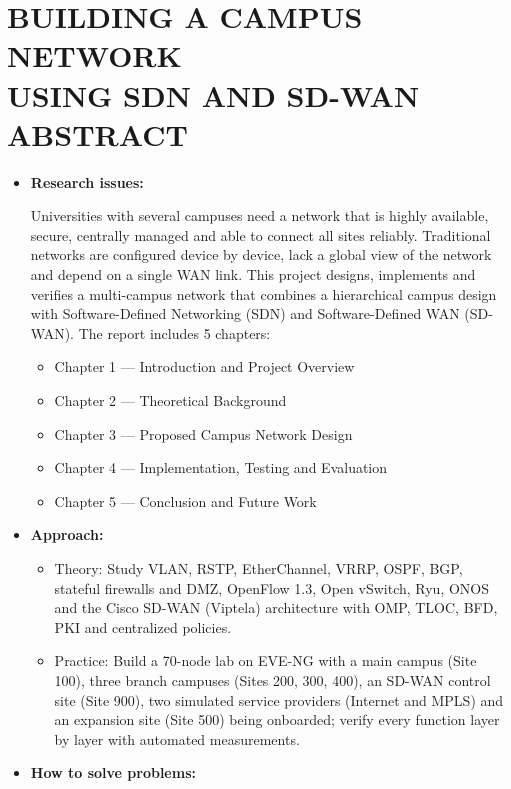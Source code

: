 \section*{\fontsize{16pt}{15pt}\selectfont BUILDING A CAMPUS NETWORK \\USING SDN AND SD-WAN \\ABSTRACT}

\begin{itemize}
    \item[-] \textbf{Research issues:}

    Universities with several campuses need a network that is highly available, secure, centrally managed and able to connect all sites reliably. Traditional networks are configured device by device, lack a global view of the network and depend on a single WAN link. This project designs, implements and verifies a multi-campus network that combines a hierarchical campus design with Software-Defined Networking (SDN) and Software-Defined WAN (SD-WAN). The report includes 5 chapters:
        \begin{itemize}
        \item[•] Chapter 1 --- Introduction and Project Overview
        \item[•] Chapter 2 --- Theoretical Background
        \item[•] Chapter 3 --- Proposed Campus Network Design
        \item[•] Chapter 4 --- Implementation, Testing and Evaluation
        \item[•] Chapter 5 --- Conclusion and Future Work
        \end{itemize}
    \item[-] \textbf{Approach:}
        \begin{itemize}
        \item[•] Theory: Study VLAN, RSTP, EtherChannel, VRRP, OSPF, BGP, stateful firewalls and DMZ, OpenFlow 1.3, Open vSwitch, Ryu, ONOS and the Cisco SD-WAN (Viptela) architecture with OMP, TLOC, BFD, PKI and centralized policies.
        \item[•] Practice: Build a 70-node lab on EVE-NG with a main campus (Site 100), three branch campuses (Sites 200, 300, 400), an SD-WAN control site (Site 900), two simulated service providers (Internet and MPLS) and an expansion site (Site 500) being onboarded; verify every function layer by layer with automated measurements.
    \end{itemize}
    \item[-] \textbf{How to solve problems:}

\end{itemize}
